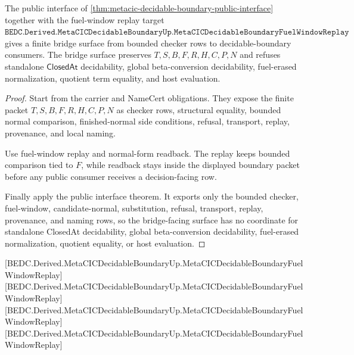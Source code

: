 \begin{theorem}
\label{thm:metacic-decidable-boundary-bridged-status}
The public interface of \autoref{thm:metacic-decidable-boundary-public-interface} together with the fuel-window replay target $\texttt{BEDC.Derived.MetaCICDecidableBoundaryUp.MetaCICDecidableBoundaryFuelWindowReplay}$ gives a finite bridge surface from bounded checker rows to decidable-boundary consumers. The bridge surface preserves $T,S,B,F,R,H,C,P,N$ and refuses standalone $\mathsf{ClosedAt}$ decidability, global beta-conversion decidability, fuel-erased normalization, quotient term equality, and host evaluation.
\end{theorem}
\begin{proof}
Start from the carrier and NameCert obligations. They expose the finite packet $T,S,B,F,R,H,C,P,N$ as checker rows, structural equality, bounded normal comparison, finished-normal side conditions, refusal, transport, replay, provenance, and local naming.

Use fuel-window replay and normal-form readback. The replay keeps bounded comparison tied to $F$, while readback stays inside the displayed boundary packet before any public consumer receives a decision-facing row.

Finally apply the public interface theorem. It exports only the bounded checker, fuel-window, candidate-normal, substitution, refusal, transport, replay, provenance, and naming rows, so the bridge-facing surface has no coordinate for standalone ClosedAt decidability, global beta-conversion decidability, fuel-erased normalization, quotient equality, or host evaluation.
\end{proof}

[BEDC.Derived.MetaCICDecidableBoundaryUp.MetaCICDecidableBoundaryFuelWindowReplay]
[BEDC.Derived.MetaCICDecidableBoundaryUp.MetaCICDecidableBoundaryFuelWindowReplay]
[BEDC.Derived.MetaCICDecidableBoundaryUp.MetaCICDecidableBoundaryFuelWindowReplay]
[BEDC.Derived.MetaCICDecidableBoundaryUp.MetaCICDecidableBoundaryFuelWindowReplay]

